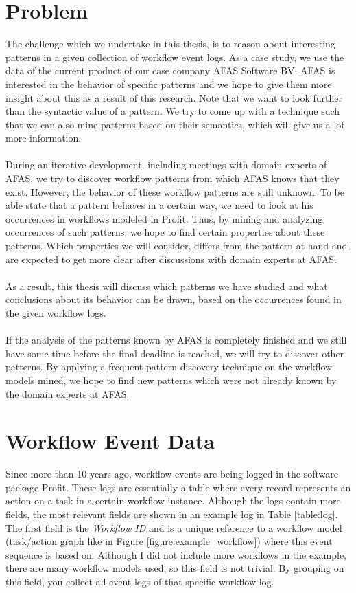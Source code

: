 \documentclass[a4paper,11pt]{article}
\begin{document}
\section{Problem}
The challenge which we undertake in this thesis, is to reason about interesting patterns in a given collection of workflow event logs. As a case study, we use the data of the current product of our case company AFAS Software BV. AFAS is interested in the behavior of specific patterns and we hope to give them more insight about this as a result of this research. Note that we want to look further than the syntactic value of a pattern. We try to come up with a technique such that we can also mine patterns based on their semantics, which will give us a lot more information.\\
\\
During an iterative development, including meetings with domain experts of AFAS, we try to discover workflow patterns from which AFAS knows that they exist. However, the behavior of these workflow patterns are still unknown. To be able state that a pattern behaves in a certain way, we need to look at his occurrences in workflows modeled in Profit. Thus, by mining and analyzing occurrences of such patterns, we hope to find certain properties about these patterns. Which properties we will consider, differs from the pattern at hand and are expected to get more clear after discussions with domain experts at AFAS.\\
\\
As a result, this thesis will discuss which patterns we have studied and what conclusions about its behavior can be drawn, based on the occurrences found in the given workflow logs.\\
\\
If the analysis of the patterns known by AFAS is completely finished and we still have some time before the final deadline is reached, we will try to discover other patterns. By applying a frequent pattern discovery technique on the workflow models mined, we hope to find new patterns which were not already known by the domain experts at AFAS.

\section{Workflow Event Data}
Since more than 10 years ago, workflow events are being logged in the software package Profit. These logs are essentially a table where every record represents an action on a task in a certain workflow instance. Although the logs contain more fields, the most relevant fields are shown in an example log in Table \ref{table:log}. The first field is the \textit{Workflow ID} and is a unique reference to a workflow model (task/action graph like in Figure \ref{figure:example_workflow}) where this event sequence is based on. Although I did not include more workflows in the example, there are many workflow models used, so this field is not trivial. By grouping on this field, you collect all event logs of that specific workflow log.
\end{document}
